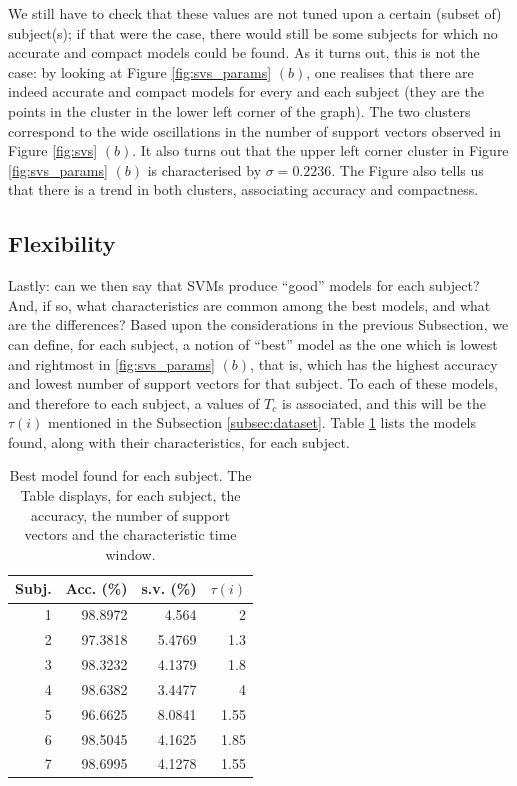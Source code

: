 \documentclass[a4paper,10pt,conference]{ieeeconf}
\begin{document}
We still have to check that these values are not tuned upon a certain
(subset of) subject(s); if that were the case, there would still be
some subjects for which no accurate and compact models could be
found. As it turns out, this is not the case: by looking at Figure
\ref{fig:svs_params} $(b)$, one realises that there are indeed
accurate and compact models for every and each subject (they are the
points in the cluster in the lower left corner of the graph). The two
clusters correspond to the wide oscillations in the number of support
vectors observed in Figure \ref{fig:svs} $(b)$.  It also turns out
that the upper left corner cluster in Figure \ref{fig:svs_params}
$(b)$ is characterised by $\sigma=0.2236$. The Figure also tells us
that there is a trend in both clusters, associating accuracy and
compactness.

\subsection{Flexibility}

Lastly: can we then say that SVMs produce ``good'' models for each
subject? And, if so, what characteristics are common among the best
models, and what are the differences? Based upon the considerations in
the previous Subsection, we can define, for each subject, a notion of
``best'' model as the one which is lowest and rightmost in
\ref{fig:svs_params} $(b)$, that is, which has the highest accuracy
and lowest number of support vectors for that subject. To each of
these models, and therefore to each subject, a values of $T_c$ is
associated, and this will be the $\tau(i)$ mentioned in the Subsection
\ref{subsec:dataset}. Table \ref{tab:tau} lists the models found,
along with their characteristics, for each subject.

\begin{table}[!t]
  \begin{center}
    \caption{Best model found for each subject. The Table displays,
    for each subject, the accuracy, the number of support vectors and
    the characteristic time window.}
    \begin{tabular}{|r|r|r|r|}
      \hline
      Subj. & Acc. (\%) & s.v. (\%) & $\tau(i)$ \\
      \hline
      1 & 98.8972 & 4.564 & 2\\
      2 & 97.3818 & 5.4769 & 1.3\\
      3 & 98.3232 & 4.1379 & 1.8\\
      4 & 98.6382 & 3.4477 & 4\\
      5 & 96.6625 & 8.0841 & 1.55\\
      6 & 98.5045 & 4.1625 & 1.85\\
      7 & 98.6995 & 4.1278 & 1.55\\
      \hline
    \end{tabular}
    \label{tab:tau}
  \end{center}
\end{table}
\end{document}
